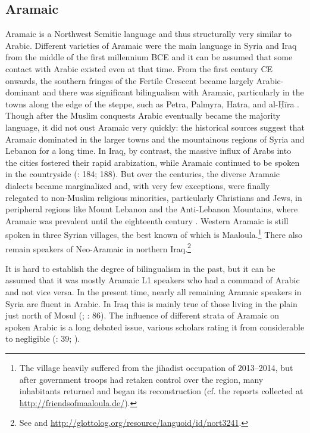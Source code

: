 \documentclass[output=paper]{langsci/langscibook}
\begin{document}
  \subsection{Aramaic} \label{aram}
Aramaic is a Northwest Semitic language and thus structurally very similar to Arabic. Different varieties of Aramaic were the main language in Syria and Iraq from the middle of the first millennium BCE and it can be assumed that some contact with Arabic existed even at that time. From the first century CE onwards, the southern fringes of the Fertile Crescent became largely Arabic-dominant and there was significant bilingualism with Aramaic, particularly in the towns along the edge of the steppe, such as Petra, Palmyra, Hatra, and al-Ḥīra \citep[260--262]{Procházka2018Fertile}. Though after the Muslim conquests Arabic eventually became the majority language, it did not oust Aramaic very quickly: the historical sources suggest that Aramaic dominated in the larger towns and the mountainous regions of Syria and Lebanon for a long time. In Iraq, by contrast, the massive influx of Arabs into the cities fostered their rapid arabization, while Aramaic continued to be spoken in the countryside (\citealt{Magidow2013}: 184; 188). But over the centuries, the diverse Aramaic dialects became marginalized and, with very few exceptions, were finally relegated to non-Muslim religious minorities, particularly Christians and Jews, in peripheral regions like Mount Lebanon and the Anti-Lebanon Mountains, where Aramaic was prevalent until the eighteenth century \citep{Retsö2011}. Western Aramaic is still spoken in three Syrian villages, the best known of which is Maaloula.\footnote{The village heavily suffered from the jihadist occupation of 2013--2014, but after government troops had retaken control over the region, many inhabitants returned and began its reconstruction (cf. the reports collected at \url{http://friendsofmaaloula.de/}).} There also remain speakers of Neo-Aramaic in northern Iraq.\footnote{See \citet{Coghill2012} and \url{http://glottolog.org/resource/languoid/id/nort3241}.} 

It is hard to establish the degree of bilingualism in the past, but it can be assumed that it was mostly Aramaic L1 speakers who had a command of Arabic and not vice versa. In the present time, nearly all remaining Aramaic speakers in Syria are fluent in Arabic. In Iraq this is mainly true of those living in the plain just north of Mosul (\citealt{ArnoldBehnstedt1993}; \citealt{Coghill2012}: 86). The influence of different strata of Aramaic on spoken Arabic is a long debated issue, various scholars rating it from considerable to negligible (\citealt{Hopkins1995}: 39; \citealt{Lentin2018}).
\end{document}
